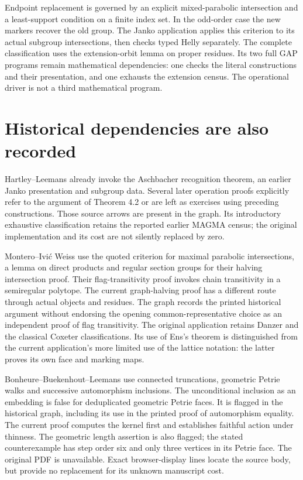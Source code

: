 \documentclass[a4paper,11pt]{article}
\begin{document}
Endpoint replacement is governed by an explicit mixed-parabolic intersection
and a least-support condition on a finite index set. In the odd-order case the
new markers recover the old group. The Janko application applies this criterion
to its actual subgroup intersections, then checks typed Helly separately.
The complete classification uses the extension-orbit lemma on proper residues.
Its two full GAP programs remain mathematical dependencies: one checks the
literal constructions and their presentation, and one exhausts the extension
census. The operational driver is not a third mathematical program.

\section{Historical dependencies are also recorded}
Hartley--Leemans already invoke the Aschbacher recognition theorem, an earlier
Janko presentation and subgroup data. Several later operation proofs explicitly
refer to the argument of Theorem 4.2 or are left as exercises using preceding
constructions. Those source arrows are present in the graph. Its introductory
exhaustive classification retains the reported earlier MAGMA census; the
original implementation and its cost are not silently replaced by zero.

Montero--Ivi\'c Weiss use the quoted criterion for maximal parabolic intersections,
a lemma on direct products and regular section groups for their halving intersection
proof. Their flag-transitivity proof invokes chain transitivity in a semiregular
polytope. The current graph-halving proof has a different route through actual
objects and residues. The graph records the printed historical argument without
endorsing the opening common-representative choice as an independent proof of
flag transitivity. The original application retains Danzer and the classical
Coxeter classifications. Its use of Ens's theorem is distinguished from the
current application's more limited use of the lattice notation: the latter
proves its own face and marking maps.

Bonheure--Buekenhout--Leemans use connected truncations, geometric Petrie walks
and successive automorphism inclusions. The unconditional inclusion as an
embedding is false for deduplicated geometric Petrie faces. It is flagged in the
historical graph, including its use in the printed proof of automorphism equality.
The current proof computes the kernel first and establishes faithful action
under thinness. The geometric length assertion is also flagged; the stated
counterexample has step order six and only three vertices in its Petrie face.
The original PDF is unavailable. Exact browser-display lines locate the source
body, but provide no replacement for its unknown manuscript cost.
\end{document}
